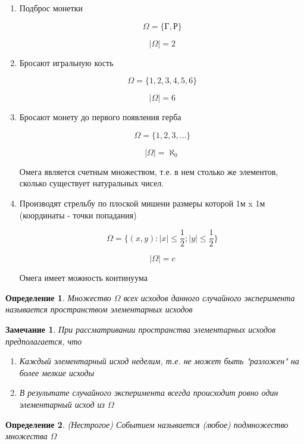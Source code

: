 \documentclass[a4paper, 14pt]{report}
\newtheorem{defenition}{Определение}[section]
\newtheorem{note}{Замечание}[section]
\begin{document}
\begin{enumerate}
    \item Подброс монетки

        $$
        \Omega = \{ \text{Г}, \text{Р}\}
        $$

        $$
        |\Omega| = 2
        $$

    \item Бросают игральную кость

        $$
        \Omega = \{ 1, 2, 3, 4, 5, 6 \}
        $$

        $$
        |\Omega| = 6
        $$

    \item Бросают монету до первого появления герба

        $$
        \Omega = \{ 1, 2, 3, \dots \}
        $$

        $$
        |\Omega| = \aleph_0
        $$

        Омега является счетным множеством, т.е. в нем столько же элементов, сколько существует натуральных чисел.

    \item Производят стрельбу по плоской мишени размеры которой 1м x 1м (координаты - точки попадания)

        $$
        \Omega = \{ (x,y) : |x| \le \frac{1}{2}; |y| \le \frac{1}{2} \}
        $$

        $$
        |\Omega| = c
        $$

        Омега имеет можность континуума
\end{enumerate}

\begin{defenition}
    Множество $\Omega$ всех исходов данного случайного эксперимента называется пространством элементарных исходов
\end{defenition}

\begin{note}
    При рассматривании пространства элементарных исходов предполагается, что
    \begin{enumerate}
        \item Каждый элементарный исход неделим, т.е. не может быть "разложен" на более мелкие исходы
        \item В результате случайного эксперимента всегда происходит ровно один элементарный исход из $\Omega$
    \end{enumerate}
\end{note}

\begin{defenition}
    (Нестрогое) Событием называется (любое) подмножество множества $\Omega$
\end{defenition}
\end{document}
